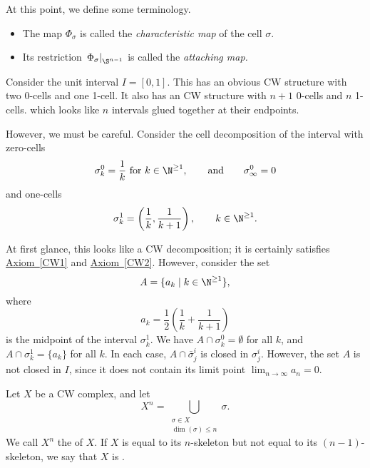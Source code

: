 \documentclass[main.tex]{subfiles}
\begin{document}
At this point, we define some terminology.
\begin{itemize}
  \item The map $\Phi_{\sigma}$ is called the \emph{characteristic map} of the cell $\sigma$.

  \item Its restriction $\left. \Phi_{\sigma} \right|_{\S^{n-1}}$ is called the \emph{attaching map.}
\end{itemize}

\begin{example}
  Consider the unit interval $I = [0, 1]$. This has an obvious CW structure with two 0-cells and one 1-cell. It also has an CW structure with $n+1$ 0-cells and $n$ 1-cells. which looks like $n$ intervals glued together at their endpoints.

  However, we must be careful. Consider the cell decomposition of the interval with zero-cells
  \begin{equation*}
    \sigma^{0}_{k} = \frac{1}{k}\text{ for } k \in \N^{\geq 1},\qquad \text{and}\qquad \sigma^{0}_{\infty} = 0
  \end{equation*}
  and one-cells
  \begin{equation*}
    \sigma^{1}_{k} = \left( \frac{1}{k}, \frac{1}{k+1} \right),\qquad k \in \N^{\geq 1}.
  \end{equation*}

  At first glance, this looks like a CW decomposition; it is certainly satisfies \hyperref[CW1]{Axiom~\ref*{CW1}} and \hyperref[CW2]{Axiom~\ref*{CW2}}. However, consider the set
  \begin{equation*}
    A = \{a_{k}\mid k \in \N^{\geq 1} \},
  \end{equation*}
  where
  \begin{equation*}
    a_{k} = \frac{1}{2}\left( \frac{1}{k} + \frac{1}{k+1} \right)
  \end{equation*}
  is the midpoint of the interval $\sigma^{1}_{k}$. We have $A \cap \sigma^{0}_{k} = \emptyset$ for all $k$, and $A \cap \sigma^{1}_{k} = \{a_{k}\}$ for all $k$. In each case, $A \cap \bar{\sigma}^{i}_{j}$ is closed in $\sigma^{i}_{j}$. However, the set $A$ is not closed in $I$, since it does not contain its limit point $\lim_{n \to \infty} a_{n} = 0$.
\end{example}

\begin{definition}
  \label{def:skeleton}
  Let $X$ be a CW complex, and let
  \begin{equation*}
    X^{n} = \bigcup_{\substack{\sigma \in X \\ \dim(\sigma) \leq n}} \sigma.
  \end{equation*}
  We call $X^{n}$ the  of $X$. If $X$ is equal to its $n$-skeleton but not equal to its $(n-1)$-skeleton, we say that $X$ is .
\end{definition}
\end{document}
